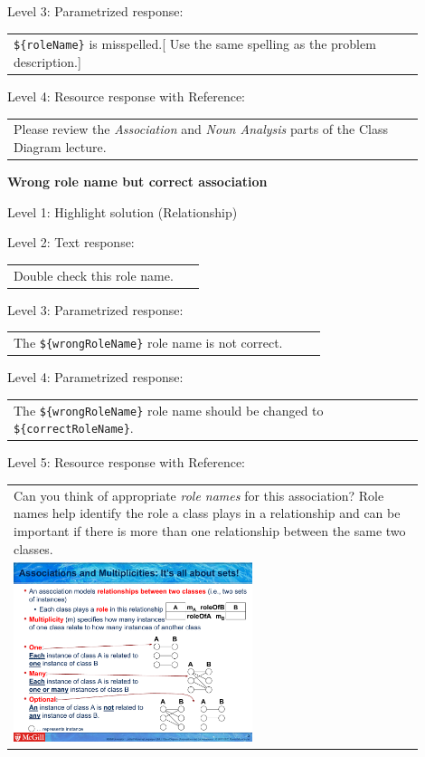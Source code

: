 \noindent Level 3: Parametrized response: \medskip

\begin{tabular}{|p{0.9\linewidth}}
\verb|${roleName}| is misspelled.[ Use the same spelling as the problem description.]
\end{tabular} \medskip

\noindent Level 4: Resource response with Reference: \medskip

\begin{tabular}{|p{0.9\linewidth}}
Please review the \textit{Association} and \textit{Noun Analysis} parts of the Class Diagram lecture.
\end{tabular} \medskip


\noindent \textbf{Wrong role name but correct association} \medskip

\noindent Level 1: Highlight solution (Relationship) \medskip

\noindent Level 2: Text response: \medskip

\begin{tabular}{|p{0.9\linewidth}}
Double check this role name.
\end{tabular} \medskip

\noindent Level 3: Parametrized response: \medskip

\begin{tabular}{|p{0.9\linewidth}}
The \verb|${wrongRoleName}| role name is not correct.
\end{tabular} \medskip

\noindent Level 4: Parametrized response: \medskip

\begin{tabular}{|p{0.9\linewidth}}
The \verb|${wrongRoleName}| role name should be changed to \verb|${correctRoleName}|.
\end{tabular} \medskip

\noindent Level 5: Resource response with Reference: \medskip

\begin{tabular}{|p{0.9\linewidth}}
Can you think of appropriate \textit{role names}
for this association? Role names help identify the role a class plays in a
relationship and can be important if there is more than one relationship
between the same two classes.

\\
\includegraphics[width=0.6\textwidth]{images/role_name.png}

\end{tabular} \medskip


